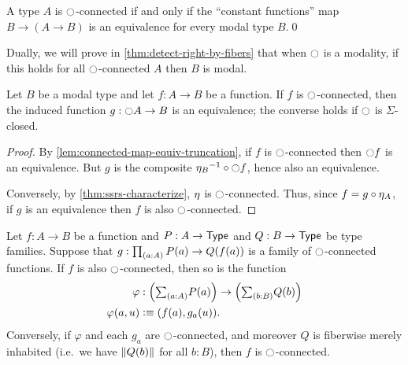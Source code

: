 \begin{cor}\label{thm:nconn-to-ntype-const}\label{connectedtotruncated}
A type $A$ is $\modal$-connected if and only if the ``constant functions'' map
$
  B \to (A\to B)
$
is an equivalence for every modal type $B$.\qed
\end{cor}

Dually, we will prove in \cref{thm:detect-right-by-fibers} that when $\modal$ is a modality, if this holds for all $\modal$-connected $A$ then $B$ is modal.

\begin{lem}\label{lem:nconnected_to_leveln_to_equiv}
Let $B$ be a modal type and let $f:A\to B$ be a function.
If $f$ is $\modal$-connected, then the induced function $g:\modal A\to B$ is an equivalence; the converse holds if $\modal$ is $\Sigma$-closed.
\end{lem}

\begin{proof}
By \cref{lem:connected-map-equiv-truncation}, if $f$ is $\modal$-connected then $\modal f$ is an equivalence.
But $g$ is the composite $\modalunit[B]^{-1}\circ \modal f$, hence also an equivalence.

Conversely, by \cref{thm:ssrs-characterize}, $\modalunit$ is $\modal$-connected.
Thus, since $f = g\circ \modalunit[A]$, if $g$ is an equivalence then $f$ is also $\modal$-connected.
\end{proof}

\begin{lem}\label{lem:nconnected_postcomp_variation}
Let $f:A\to B$ be a function and $P:A\to\type$ and $Q:B\to\type$ be type families. Suppose that $g:\prd{a:A} P(a)\to Q(f(a))$
is a family of $\modal$-connected functions.
If $f$ is also $\modal$-connected, then so is the function
\begin{align*}
\varphi &:\Parens{\sm{a:A} P(a)}\to\Parens{\sm{b:B} Q(b)}\\
\varphi(a,u) &\defeq \pairr{f(a),g_a(u)}.
\end{align*}
Conversely, if $\varphi$ and each $g_a$ are $\modal$-connected, and moreover $Q$ is fiberwise merely inhabited (i.e.\ we have $\brck{Q(b)}$ for all $b:B$), then $f$ is $\modal$-connected.
\end{lem}

